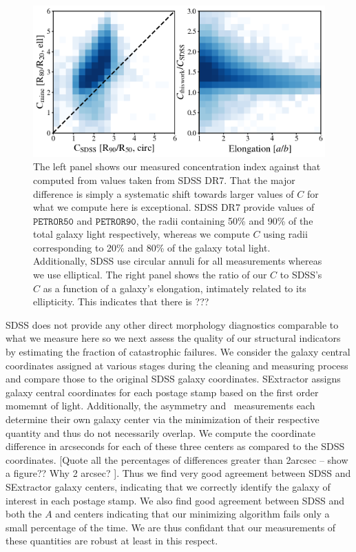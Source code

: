 \begin{figure}
\includegraphics[width=\textwidth]{Figures/compare_concentrations.png}
\caption[Comparison of concentration index from this work to that computed from SDSS.]{The left panel shows our measured concentration index against that computed from values taken from SDSS DR7. That the major difference is simply a systematic shift towards larger values of $C$ for what we compute here is exceptional. SDSS DR7 provide values of $\mathtt{PETROR50}$ and $\mathtt{PETROR90}$, the radii containing 50\% and 90\% of the total galaxy light respectively, whereas we compute $C$ using radii corresponding to 20\% and 80\% of the galaxy total light. Additionally, SDSS use circular annuli for all measurements whereas we use elliptical. The right panel shows the ratio of our $C$ to SDSS's $C$ as a function of a galaxy's elongation, intimately related to its ellipticity. This indicates that there is ???}
\label{fig: concentrations}
\end{figure}


SDSS does not provide any other direct morphology diagnostics comparable to what we measure here so we next assess the quality of our structural indicators by estimating the fraction of catastrophic failures. We consider the galaxy central coordinates assigned at various stages during the cleaning and measuring process and compare those to the original SDSS galaxy coordinates. SExtractor assigns galaxy central coordinates for each postage stamp based on the first order momemnt of light. Additionally, the asymmetry and ~measurements each determine their own galaxy center via the minimization of their respective quantity and thus do not necessarily overlap. We compute the coordinate difference in arcseconds for each of these three centers as compared to the SDSS coordinates. [Quote all the percentages of differences greater than 2arcsec -- show a figure?? Why 2 arcsec? ].  
Thus we find very good agreement between SDSS and SExtractor galaxy centers, indicating that we correctly identify the galaxy of interest in each postage stamp. We also find good agreement between SDSS and both the $A$ and  centers indicating that our minimizing algorithm fails only a small percentage of the time. We are thus confidant that our measurements of these quantities are robust at least in this respect. 

